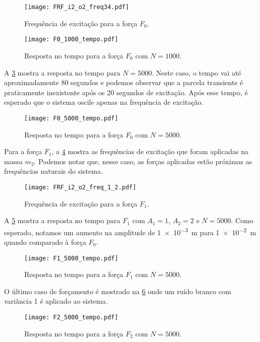 \begin{figure}
	\centering
	\texttt{[image: FRF\_i2\_o2\_freq34.pdf]}
	\caption{Frequência de excitação para a força $F_0$.}
	\label{fig:FRF_i2_o2_freq34}
\end{figure}

\begin{figure}[h]
	\centering
	\texttt{[image: F0\_1000\_tempo.pdf]}
	\caption{Resposta no tempo para a força $F_0$ com $N=1000$.}
	\label{fig:F0_1000_tempo}
\end{figure}

A \cref{fig:F0_5000_tempo} mostra a resposta no tempo para $N=5000$. Neste caso, o tempo vai até aproximadamente 80 segundos e podemos observar que a parcela transiente é praticamente inexistente após os 20 segundos de excitação. Após esse tempo, é esperado que o sistema oscile apenas na frequência de excitação.

\begin{figure}
	\centering
	\texttt{[image: F0\_5000\_tempo.pdf]}
	\caption{Resposta no tempo para a força $F_0$ com $N=5000$.}
	\label{fig:F0_5000_tempo}
\end{figure}

Para a força $F_1$, a \cref{fig:FRF_i2_o2_freq_1_2} mostra as frequências de excitação que foram aplicadas na massa $m_2$. Podemos notar que, nesse caso, as forças aplicadas estão próximas as frequências naturais do sistema.

\begin{figure}
	\centering
	\texttt{[image: FRF\_i2\_o2\_freq\_1\_2.pdf]}
	\caption{Frequência de excitação para a força $F_1$.}
	\label{fig:FRF_i2_o2_freq_1_2}
\end{figure}

A \cref{fig:F1_5000_tempo} mostra a resposta no tempo para $F_1$ com $ A_1 = 1 $, $ A_2 = 2  $ e $ N=5000 $. Como esperado, notamos um aumento na amplitude de \SI{1e-3}{\m} para \SI{1e-2}{\m} quando comparado à força $ F_0 $.

\begin{figure}
	\centering
	\texttt{[image: F1\_5000\_tempo.pdf]}
	\caption{Resposta no tempo para a força $F_1$ com $N=5000$.}
	\label{fig:F1_5000_tempo}
\end{figure}

O último caso de forçamento é mostrado na \cref{fig:F2_5000_tempo} onde um ruído branco com variância 1 é aplicado ao sistema.

\begin{figure}[h]
	\centering
	\texttt{[image: F2\_5000\_tempo.pdf]}
	\caption{Resposta no tempo para a força $F_2$ com $N=5000$.}
	\label{fig:F2_5000_tempo}
\end{figure}

